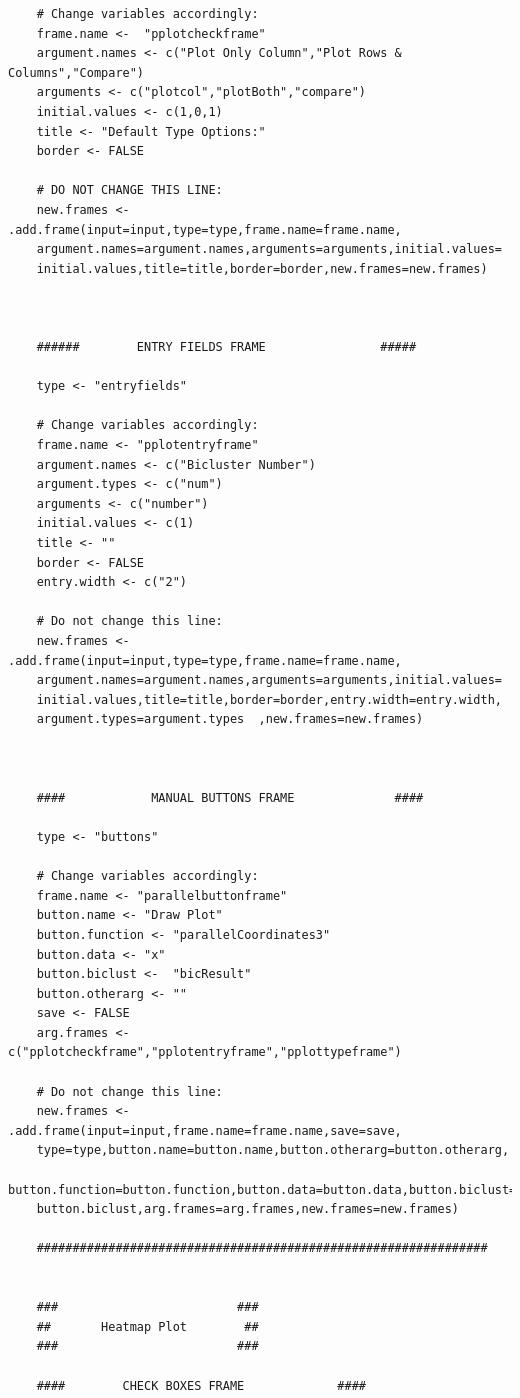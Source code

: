 \documentclass[a4paper]{article}\usepackage[]{graphicx}\usepackage[]{color}
\begin{document}
\begin{verbatim}
	# Change variables accordingly:
	frame.name <-  "pplotcheckframe"
	argument.names <- c("Plot Only Column","Plot Rows & Columns","Compare") 
	arguments <- c("plotcol","plotBoth","compare") 
	initial.values <- c(1,0,1) 
	title <- "Default Type Options:"
	border <- FALSE
	
	# DO NOT CHANGE THIS LINE:
	new.frames <- .add.frame(input=input,type=type,frame.name=frame.name,
    argument.names=argument.names,arguments=arguments,initial.values=
    initial.values,title=title,border=border,new.frames=new.frames)
	
	
	
	######		  ENTRY FIELDS FRAME 				#####
	
	type <- "entryfields"
	
	# Change variables accordingly:
	frame.name <- "pplotentryframe"  
	argument.names <- c("Bicluster Number") 
	argument.types <- c("num")
	arguments <- c("number")
	initial.values <- c(1)
	title <- ""
	border <- FALSE
	entry.width <- c("2")  
	
	# Do not change this line:
	new.frames <- .add.frame(input=input,type=type,frame.name=frame.name,
    argument.names=argument.names,arguments=arguments,initial.values=
    initial.values,title=title,border=border,entry.width=entry.width,
    argument.types=argument.types  ,new.frames=new.frames)
	
	
	
	####	    	MANUAL BUTTONS FRAME 			  ####
	
	type <- "buttons"
	
	# Change variables accordingly:
	frame.name <- "parallelbuttonframe"  
	button.name <- "Draw Plot"  
	button.function <- "parallelCoordinates3" 
	button.data <- "x" 
	button.biclust <-  "bicResult" 
	button.otherarg <- ""
	save <- FALSE
	arg.frames <- c("pplotcheckframe","pplotentryframe","pplottypeframe") 
	
	# Do not change this line:
	new.frames <- .add.frame(input=input,frame.name=frame.name,save=save,
    type=type,button.name=button.name,button.otherarg=button.otherarg,
    button.function=button.function,button.data=button.data,button.biclust=
    button.biclust,arg.frames=arg.frames,new.frames=new.frames)
	
	###############################################################
	
	
	###                         ###
	##       Heatmap Plot        ##
	###                         ###
	
	####		CHECK BOXES FRAME 			  ####
	

\end{verbatim}
\end{document}
